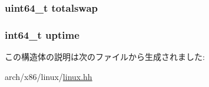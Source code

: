 \label{structX86Linux64_1_1tgt__sysinfo_a4e4ed68dad22afd974a82cbc557525dc}
\hypertarget{structX86Linux64_1_1tgt__sysinfo_a083d391d3cd3c507c32c0b3967fdb33c}{
\subsubsection[{totalswap}]{\setlength{\rightskip}{0pt plus 5cm}uint64\_\-t {\bf totalswap}}}
\label{structX86Linux64_1_1tgt__sysinfo_a083d391d3cd3c507c32c0b3967fdb33c}
\hypertarget{structX86Linux64_1_1tgt__sysinfo_a382d83f87fed25a254be85c2a0b40b03}{
\subsubsection[{uptime}]{\setlength{\rightskip}{0pt plus 5cm}int64\_\-t {\bf uptime}}}
\label{structX86Linux64_1_1tgt__sysinfo_a382d83f87fed25a254be85c2a0b40b03}


この構造体の説明は次のファイルから生成されました:\begin{DoxyCompactItemize}
\item 
arch/x86/linux/\hyperlink{arch_2x86_2linux_2linux_8hh}{linux.hh}\end{DoxyCompactItemize}
